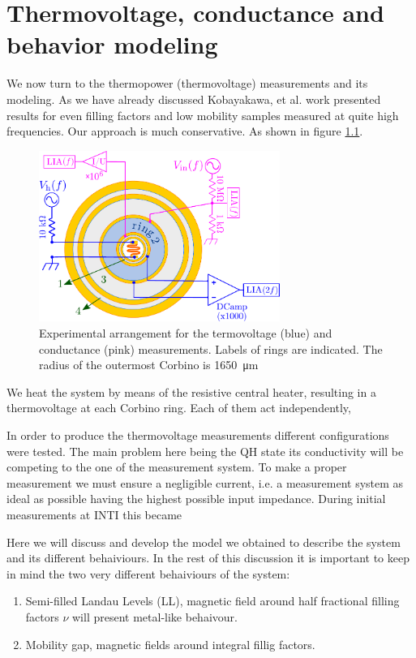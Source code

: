\chapter{Thermovoltage, conductance and\\ behavior modeling}
\label{ch:vtp_g_model}


We now turn to the thermopower (thermovoltage) measurements and its modeling. As we have already discussed Kobayakawa, et al. \cite{kobayakawa2013diffusion} work presented results for even filling factors and low mobility samples measured at quite high frequencies. Our approach is much conservative. As shown in figure \ref{fig:setupVtpG}.

\begin{figure}
    \centering
    \includegraphics[width = 0.7\textwidth]{figures/vtpGmodel/setup_vtp_g.pdf}
    \caption{Experimental arrangement for the termovoltage (blue) and conductance (pink) measurements. Labels of rings are indicated. The radius of the outermost Corbino is \SI{1650}{\micro\meter}}
    \label{fig:setupVtpG}
\end{figure}

We heat the system by means of the resistive central heater, resulting in a thermovoltage at each Corbino ring. Each of them act independently, 

In order to produce the thermovoltage measurements different configurations were tested. The main problem here being the QH state its conductivity will be competing to the one of the measurement system. To make a proper measurement we must ensure a negligible current, i.e. a measurement system as ideal as possible having the highest possible input impedance. During initial measurements at INTI this became 



Here we will discuss and develop the model we obtained to describe the system and its different behaiviours. In the rest of this discussion it is important to keep in mind the two very different behaiviours of the system:
\begin{enumerate}
    \item Semi-filled Landau Levels (LL), magnetic field around half fractional filling factors $ \nu $ will present metal-like behaivour.
    \item Mobility gap, magnetic fields around integral fillig factors.
\end{enumerate}

